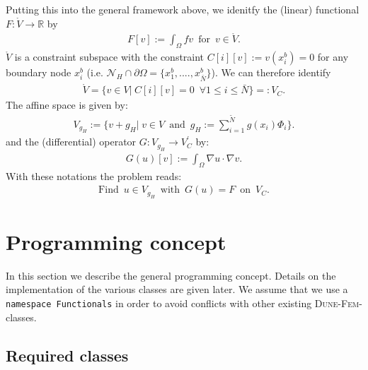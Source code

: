 \documentclass[a4paper,11pt]{article}
\numberwithin{equation}{section}
\newcommand{\dunefem}{\textsc{Dune-Fem}\xspace}
\begin{document}
  Putting this into the general framework above, we idenitfy the (linear) functional $F:\mathring{V}\rightarrow \mathbb{R}$ by
  \begin{align*}
  F[v] := \int_{\Omega} f v \enspace \mbox{for} \enspace v \in \mathring{V}.
  \end{align*}
  $\mathring{V}$ is a constraint subspace with the constraint $C[i][v] := v(x_i^b) = 0$ for any boundary node $x_i^b$ (i.e. $\mathcal{N}_H \cap \partial \Omega = \{ x_1^b, ...., x_{\bar{N}}^b\}$). We can therefore identify
  \begin{align*}
  \mathring{V} = \{ v \in V| \hspace{3pt} C[i][v] = 0 \enspace \forall 1\le i\le \bar{N} \} =: V_C.
  \end{align*}
  The affine space is given by:
  \begin{align*}
  V_{g_H} := \{ v + g_H | \hspace{3pt} v \in V \enspace \mbox{and} \enspace g_H := \sum_{i=1}^{\tilde{N}} g(x_i) \Phi_i \}.
  \end{align*}
  and the (differential) operator $G : V_{g_H} \rightarrow V_C^{\prime}$ by:
  \begin{align*}
  G(u)[v] := \int_{\Omega} \nabla u \cdot \nabla v.
  \end{align*}
  With these notations the problem reads:
  \begin{align*}
  \mbox{Find} \enspace u \in V_{g_H} \enspace \mbox{with} \enspace G(u) = F \enspace \mbox{on} \enspace V_C.
  \end{align*}

\section{Programming concept}

In this section we describe the general programming concept. Details on the implementation of the various classes are given later. We assume that we use a {\tt namespace Functionals} in order to avoid conflicts with other existing \dunefem-classes.

\subsection{Required classes}
\end{document}
